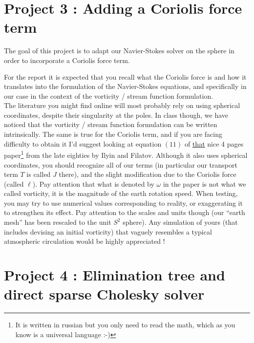 \documentclass[11pt]{article}
\begin{document}
\pagebreak

\section*{Project 3 : Adding a Coriolis force term}
The goal of this project is to adapt our Navier-Stokes solver on the sphere
in order to incorporate a Coriolis force term. 

\noindent 
For the report it is expected that you recall what the Coriolis 
force is and how it translates into the formulation of the 
Navier-Stokes equations, and specifically in our case in the context 
of the vorticity / stream function formulation.\\
The literature you might find online will most probably rely on using 
spherical coordinates, despite their singularity at the poles. In class though, 
we have noticed that the vorticity / stream function formulation can be
written intrinsically. The same is true for the Coriolis
term, and if you are facing difficulty to obtain it I'd suggest looking
at equation $(11)$ of 
\href{https://www.mathnet.ru/links/7186db239fce310100fce16f1e2395df/dan7557.pdf}{that}
nice 4 pages paper\footnote{It is written in russian but you only need to read
the math, which as you know is a universal language :-)} from the late eighties by Ilyin and
Filatov. Although it also uses spherical coordinates, you should recognize all
of our terms (in particular our transport term $T$ is called $J$ there), and the slight
modification due to the Coriolis force (called $\ell$). Pay attention that what is denoted by 
$\omega$ in the paper is not what we called vorticity, it is the magnitude of the
earth rotation speed. When testing, you may try to use numerical values corresponding 
to reality, or exaggerating it to strengthen its effect. Pay attention to the
scales and units though (our ``earth mesh'' has been rescaled to the unit $S^2$ 
sphere). Any simulation of yours (that includes devising an initial vorticity) 
that vaguely resembles a typical atmospheric circulation would be highly
appreciated ! 

\pagebreak
\section*{Project 4 : Elimination tree and direct sparse Cholesky solver}
\end{document}
